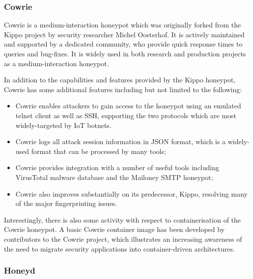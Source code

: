 	\subsubsection{Cowrie} \label{AboutCowrie}
	
	Cowrie is a medium-interaction honeypot which was originally forked from the Kippo project by security researcher Michel Oosterhof. It is actively maintained and supported by a dedicated community, who provide quick response times to queries and bug-fixes. It is widely used in both research and production projects as a medium-interaction honeypot. \cite{PickyAttackers2017} \cite{TPotWebpagev17} \cite{ModernHoneyNetworkLaunchAnnouncement} 
    
	In addition to the capabilities and features provided by the Kippo honeypot, Cowrie has some additional features \cite{CowrieGithub} \cite{CowrieWebsite} including but not limited to the following:
	
	\begin{itemize}
		
		\item Cowrie enables attackers to gain access to the honeypot using an emulated telnet client as well as SSH, supporting the two protocols which are most widely-targeted by IoT botnets. \cite{UnderstandingTheMiraiBotnet} \cite{HajimeMysteriousBotnet}
		
		\item Cowrie logs all attack session information in JSON format, which is a widely-used format that can be processed by many tools;
        
        \item Cowrie provides integration with a number of useful tools including VirusTotal malware database and the Mailoney SMTP honeypot;
        
		\item Cowrie also improves substantially on its predecessor, Kippo, resolving many of the major fingerprinting issues.
	\end{itemize}

    Interestingly, there is also some activity with respect to containerisation of the Cowrie honeypot. A basic Cowrie container image has been developed by contributors to the Cowrie project, \cite{DockerCowrie} which illustrates an increasing awareness of the need to migrate security applications into container-driven architectures.
	
	\subsubsection{Honeyd} \label{AboutHoneyd}
    

